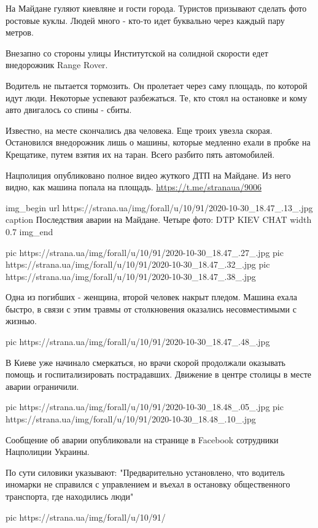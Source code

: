 На Майдане гуляют киевляне и гости города. Туристов призывают сделать фото
ростовые куклы. Людей много - кто-то идет буквально через каждый пару метров. 

Внезапно со стороны улицы Институтской на солидной скорости едет внедорожник
Range Rover.

Водитель не пытается тормозить. Он пролетает через саму площадь, по которой
идут люди. Некоторые успевают разбежаться. Те, кто стоял на остановке и кому
авто двигалось со спины - сбиты. 

Известно, на месте скончались два человека. Еще троих увезла скорая.
Остановился внедорожник лишь о машины, которые медленно ехали в пробке на
Крещатике, путем взятия их на таран. Всего разбито пять автомобилей. 

Нацполиция опубликовано полное видео жуткого ДТП на Майдане. Из него видно, как
машина попала на площадь.
\url{https://t.me/stranaua/9006}

\ifcmt
img_begin 
	url https://strana.ua/img/forall/u/10/91/2020-10-30_18.47_.13_.jpg
	caption Последствия аварии на Майдане. Четыре фото: DTP KIEV CHAT
	width 0.7
img_end
\fi

\ifcmt
pic https://strana.ua/img/forall/u/10/91/2020-10-30_18.47_.27_.jpg
pic https://strana.ua/img/forall/u/10/91/2020-10-30_18.47_.32_.jpg
pic https://strana.ua/img/forall/u/10/91/2020-10-30_18.47_.38_.jpg
\fi

Одна из погибших - женщина, второй человек накрыт пледом. Машина ехала быстро,
в связи с этим травмы от столкновения оказались несовместимыми с жизнью. 

\ifcmt
pic https://strana.ua/img/forall/u/10/91/2020-10-30_18.47_.48_.jpg
\fi

В Киеве уже начинало смеркаться, но врачи скорой продолжали оказывать помощь и
госпитализировать пострадавших. Движение в центре столицы в месте аварии
ограничили. 

\ifcmt
pic https://strana.ua/img/forall/u/10/91/2020-10-30_18.48_.05_.jpg
pic https://strana.ua/img/forall/u/10/91/2020-10-30_18.48_.10_.jpg
\fi

Сообщение об аварии опубликовали на странице в Facebook сотрудники Нацполиции
Украины.

По сути силовики указывают: "Предварительно установлено, что водитель иномарки
не справился с управлением и въехал в остановку общественного транспорта, где
находились люди"

\ifcmt
pic https://strana.ua/img/forall/u/10/91/%
\fi


